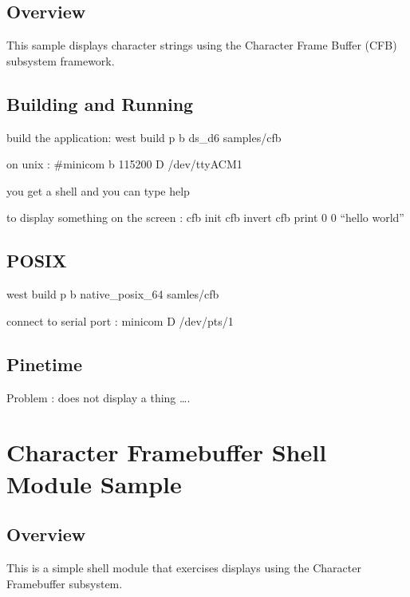 \documentclass[letterpaper,10pt,english]{sphinxmanual}
\begin{document}
\subsection{Overview}
\label{\detokenize{samples/appsamplescfbREADME:overview}}
This sample displays character strings using the Character Frame Buffer
(CFB) subsystem framework.


\subsection{Building and Running}
\label{\detokenize{samples/appsamplescfbREADME:building-and-running}}
build the application: west build \sphinxhyphen{}p \sphinxhyphen{}b ds\_d6 samples/cfb

on unix : \#minicom \sphinxhyphen{}b 115200 \sphinxhyphen{}D /dev/ttyACM1

you get a shell and you can type help

to display something on the screen :
cfb init
cfb invert
cfb print 0 0 “hello world”


\subsection{POSIX}
\label{\detokenize{samples/appsamplescfbREADME:posix}}
west build \sphinxhyphen{}p \sphinxhyphen{}b native\_posix\_64 samles/cfb

connect to serial port :
minicom \sphinxhyphen{}D /dev/pts/1


\subsection{Pinetime}
\label{\detokenize{samples/appsamplescfbREADME:pinetime}}
Problem : does not display a thing ….


\section{Character Framebuffer Shell Module Sample}
\label{\detokenize{samples/appsamplescfb_shellREADME:character-framebuffer-shell-module-sample}}\label{\detokenize{samples/appsamplescfb_shellREADME:cfb-shell-sample}}\label{\detokenize{samples/appsamplescfb_shellREADME::doc}}

\subsection{Overview}
\label{\detokenize{samples/appsamplescfb_shellREADME:overview}}
This is a simple shell module that exercises displays using the Character
Framebuffer subsystem.
\end{document}
